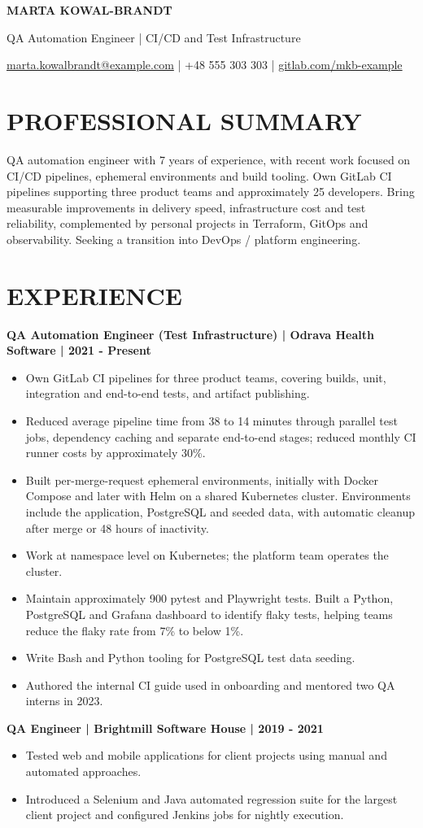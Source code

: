 \documentclass[11pt,a4paper]{article}
\newcommand{\cvsection}[1]{\section*{#1}}
\newcommand{\cvrole}[1]{\noindent\textbf{#1}\par}
\begin{document}
{\LARGE\bfseries\color{primarycolor} MARTA KOWAL-BRANDT}\par
{\large\color{accentcolor} QA Automation Engineer | CI/CD and Test Infrastructure}\par
{\small \href{mailto:marta.kowalbrandt@example.com}{marta.kowalbrandt@example.com} | +48 555 303 303 | \href{https://gitlab.com/mkb-example}{gitlab.com/mkb-example}}\par

\cvsection{PROFESSIONAL SUMMARY}
QA automation engineer with 7 years of experience, with recent work focused on CI/CD pipelines, ephemeral environments and build tooling. Own GitLab CI pipelines supporting three product teams and approximately 25 developers. Bring measurable improvements in delivery speed, infrastructure cost and test reliability, complemented by personal projects in Terraform, GitOps and observability. Seeking a transition into DevOps / platform engineering.

\cvsection{EXPERIENCE}
\cvrole{QA Automation Engineer (Test Infrastructure) | Odrava Health Software | 2021 - Present}
\begin{itemize}
\item Own GitLab CI pipelines for three product teams, covering builds, unit, integration and end-to-end tests, and artifact publishing.
\item Reduced average pipeline time from 38 to 14 minutes through parallel test jobs, dependency caching and separate end-to-end stages; reduced monthly CI runner costs by approximately 30\%.
\item Built per-merge-request ephemeral environments, initially with Docker Compose and later with Helm on a shared Kubernetes cluster. Environments include the application, PostgreSQL and seeded data, with automatic cleanup after merge or 48 hours of inactivity.
\item Work at namespace level on Kubernetes; the platform team operates the cluster.
\item Maintain approximately 900 pytest and Playwright tests. Built a Python, PostgreSQL and Grafana dashboard to identify flaky tests, helping teams reduce the flaky rate from 7\% to below 1\%.
\item Write Bash and Python tooling for PostgreSQL test data seeding.
\item Authored the internal CI guide used in onboarding and mentored two QA interns in 2023.
\end{itemize}

\cvrole{QA Engineer | Brightmill Software House | 2019 - 2021}
\begin{itemize}
\item Tested web and mobile applications for client projects using manual and automated approaches.
\item Introduced a Selenium and Java automated regression suite for the largest client project and configured Jenkins jobs for nightly execution.
\end{itemize}
\end{document}
